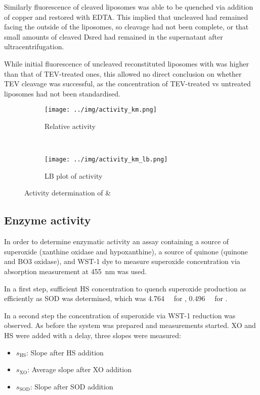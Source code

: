 Similarly fluorescence of cleaved liposomes was able to be quenched via
addition of copper and restored with EDTA. This implied that uncleaved
\hsdsred{} had remained facing the outside of the liposomes, so cleavage had
not been complete, or that small amounts of cleaved Dsred had remained in the
supernatant after ultracentrifugation.

While initial fluorescence of uncleaved reconstituted liposomes with \hsdsred{}
was higher than that of TEV-treated ones, this allowed no direct conclusion on
whether TEV cleavage was successful, as the concentration of TEV-treated vs
untreated liposomes had not been standardised.

\begin{figure*}
	\centering
	\begin{subfigure}{0.45\linewidth}
		\centering
		\texttt{[image: ../img/activity\_km.png]}
		\caption{Relative activity}
		\label{fig:activity_km}
	\end{subfigure}
	~
	\begin{subfigure}{0.45\linewidth}
		\centering
		\texttt{[image: ../img/activity\_km\_lb.png]}
		\caption{LB plot of activity}
		\label{fig:activity_km_lb}
	\end{subfigure}

	\caption{Activity determination of \hs{} \& \hsmut{}}
	\label{fig:activity}
\end{figure*}


\subsection{Enzyme activity}

In order to determine enzymatic activity an assay containing a source of
superoxide (xanthine oxidase and hypoxanthine), a source of quinone (quinone
and BO3 oxidase), and WST-1 dye to measure superoxide concentration via
absorption measurement at \SI{455}{\nm} was used.

In a first step, sufficient HS concentration to quench superoxide production as
efficiently as SOD was determined, which was \SI{4.764}{\micro\Molar} for 
\hsmut{}, \SI{0.496}{\micro\Molar} for \hs{}.

In a second step the concentration of superoxide via WST-1 reduction was
observed. As before the system was prepared and measurements started. XO and HS
were added with a delay, three slopes were measured:

\begin{itemize}
	\item $s_{\text{HS}}$: Slope after HS addition
	\item $s_{\text{XO}}$: Average slope after XO addition
	\item $s_{\text{SOD}}$: Slope after SOD addition
\end{itemize}

